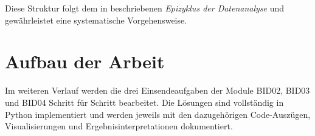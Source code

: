 Diese Struktur folgt dem in \cite{2} beschriebenen \emph{Epizyklus der Datenanalyse} und gewährleistet eine systematische Vorgehensweise.

\section{Aufbau der Arbeit}

Im weiteren Verlauf werden die drei Einsendeaufgaben der Module BID02, BID03 und BID04 Schritt für Schritt bearbeitet. Die Lösungen sind vollständig in Python implementiert und werden jeweils mit den dazugehörigen Code-Auszügen, Visualisierungen und Ergebnisinterpretationen dokumentiert.

